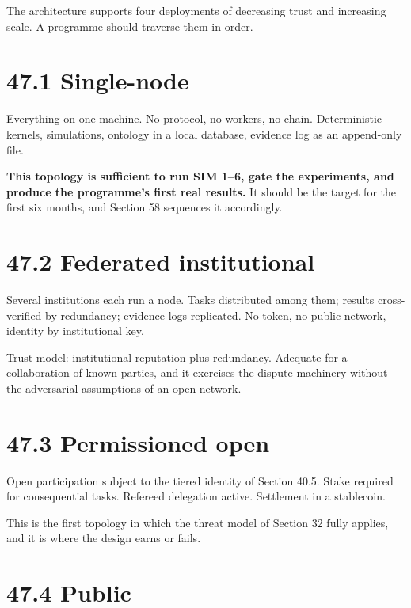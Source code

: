 \documentclass[
  11pt]{report}
\begin{document}
The architecture supports four deployments of decreasing trust and
increasing scale. A programme should traverse them in order.

\hypertarget{single-node}{%
\section{47.1 Single-node}\label{single-node}}

Everything on one machine. No protocol, no workers, no chain.
Deterministic kernels, simulations, ontology in a local database,
evidence log as an append-only file.

\textbf{This topology is sufficient to run SIM 1--6, gate the
experiments, and produce the programme's first real results.} It should
be the target for the first six months, and Section 58 sequences it
accordingly.

\hypertarget{federated-institutional}{%
\section{47.2 Federated institutional}\label{federated-institutional}}

Several institutions each run a node. Tasks distributed among them;
results cross-verified by redundancy; evidence logs replicated. No
token, no public network, identity by institutional key.

Trust model: institutional reputation plus redundancy. Adequate for a
collaboration of known parties, and it exercises the dispute machinery
without the adversarial assumptions of an open network.

\hypertarget{permissioned-open}{%
\section{47.3 Permissioned open}\label{permissioned-open}}

Open participation subject to the tiered identity of Section 40.5. Stake
required for consequential tasks. Refereed delegation active. Settlement
in a stablecoin.

This is the first topology in which the threat model of Section 32 fully
applies, and it is where the design earns or fails.

\hypertarget{public}{%
\section{47.4 Public}\label{public}}
\end{document}
